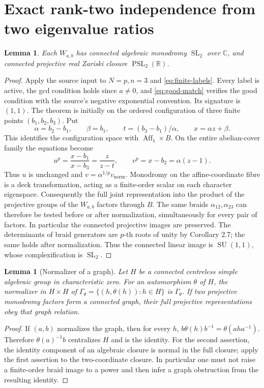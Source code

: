 \documentclass[11pt]{article}
\newtheorem{lemma}[theorem]{Lemma}
\theoremstyle{remark}
\newcommand{\C}{\mathbb C}
\newcommand{\R}{\mathbb R}
\newcommand{\SL}{\operatorname{SL}}
\newcommand{\SU}{\operatorname{SU}}
\newcommand{\PSL}{\operatorname{PSL}}
\begin{document}
\section{Exact rank-two independence from two eigenvalue ratios}
\begin{lemma}\label{lem:projection}
Each \(W_{a,b}\) has connected algebraic monodromy \(\SL_2\) over
\(\C\), and connected projective real Zariski closure \(\PSL_2(\R)\).
\end{lemma}
\begin{proof}
Apply the source input to \(N=p,n=3\) and \eqref{eq:finite-labels}.
Every label is active, the gcd condition holds since \(a\neq0\), and
\eqref{eq:good-match} verifies the good condition with the source's
negative exponential convention.  Its signature is \((1,1)\).
The theorem is initially on the ordered configuration of three finite
points \((b_1,b_2,b_3)\).  Put
\[
 \alpha=b_2-b_1,\qquad \beta=b_1,\qquad
 t=(b_3-b_1)/\alpha,\qquad x=\alpha z+\beta.
\]
This identifies the configuration space with \(\operatorname{Aff}_1\times B\).
On the entire abelian-cover family the equations become
\[
 u^p=\frac{x-b_1}{x-b_3}=\frac{z}{z-t},\qquad
 v^p=x-b_2=\alpha(z-1).
\]
Thus \(u\) is unchanged and \(v=\alpha^{1/p}v_{\mathrm{norm}}\).
Monodromy on the affine-coordinate fibre is a deck transformation,
acting as a finite-order scalar on each character eigenspace.
Consequently the full joint representation into the product of the
projective groups of the \(W_{a,b}\) factors through \(B\).
The same braids \(\alpha_{12},\alpha_{23}\) can therefore be tested
before or after normalization, simultaneously for every pair of factors.
In particular the connected projective images are preserved.
The determinants of braid generators are \(p\)-th roots of unity by
Corollary 2.7; the same holds after normalization.  Thus the connected
linear image is \(\SU(1,1)\), whose complexification is \(\SL_2\).
\end{proof}

\begin{lemma}[Normalizer of a graph]\label{lem:normalizer}
Let \(H\) be a connected centreless simple algebraic group in
characteristic zero.  For an automorphism \(\theta\) of \(H\), the
normalizer in \(H\times H\) of
\(\Gamma_\theta=\{(h,\theta(h)):h\in H\}\) is \(\Gamma_\theta\).
If two projective monodromy factors form a connected graph, their full
projective representations obey that graph relation.
\end{lemma}
\begin{proof}
If \((a,b)\) normalizes the graph, then for every \(h\),
\(b\theta(h)b^{-1}=\theta(aha^{-1})\).  Therefore
\(\theta(a)^{-1}b\) centralizes \(H\) and is the identity.
For the second assertion, the identity component of an algebraic
closure is normal in the full closure; apply the first assertion to
the two-coordinate closure.  In particular one must not raise a
finite-order braid image to a power and then infer a graph obstruction
from the resulting identity.
\end{proof}
\end{document}
